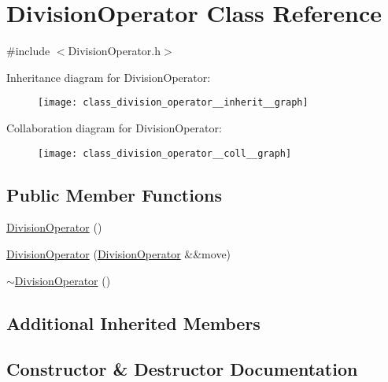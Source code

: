 \hypertarget{class_division_operator}{}\section{Division\+Operator Class Reference}
\label{class_division_operator}


{\ttfamily \#include $<$Division\+Operator.\+h$>$}



Inheritance diagram for Division\+Operator\+:
\nopagebreak
\begin{figure}[H]
\begin{center}
\leavevmode
\texttt{[image: class\_division\_operator\_\_inherit\_\_graph]}
\end{center}
\end{figure}


Collaboration diagram for Division\+Operator\+:
\nopagebreak
\begin{figure}[H]
\begin{center}
\leavevmode
\texttt{[image: class\_division\_operator\_\_coll\_\_graph]}
\end{center}
\end{figure}
\subsection*{Public Member Functions}
\begin{DoxyCompactItemize}
\item 
\mbox{\hyperlink{class_division_operator_a722ddb32014d8c6e9004da378b17f115}{Division\+Operator}} ()
\item 
\mbox{\hyperlink{class_division_operator_aa6a6749442a54a8aa94af86f87e51f3a}{Division\+Operator}} (\mbox{\hyperlink{class_division_operator}{Division\+Operator}} \&\&move)
\item 
\mbox{\hyperlink{class_division_operator_ae3df9e443621eb682867305efd45c8d5}{$\sim$\+Division\+Operator}} ()
\end{DoxyCompactItemize}
\subsection*{Additional Inherited Members}


\subsection{Constructor \& Destructor Documentation}
\mbox{\label{class_division_operator_a722ddb32014d8c6e9004da378b17f115}} 
